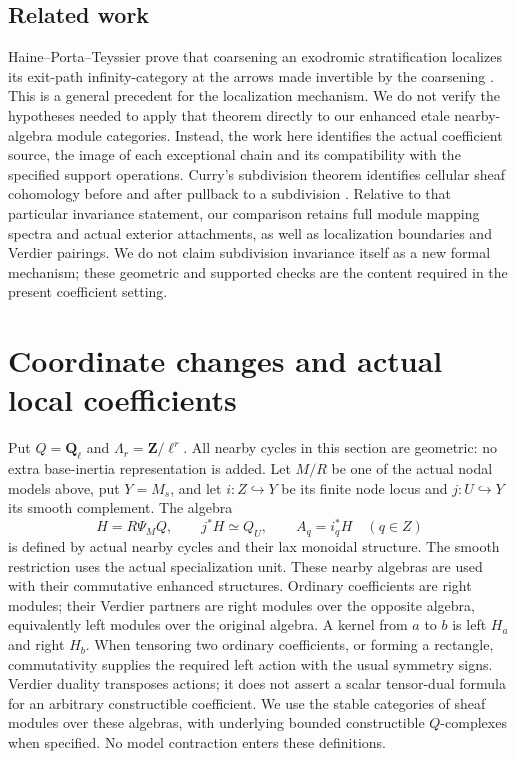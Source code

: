 \documentclass[11pt]{article}
\theoremstyle{definition}
\theoremstyle{remark}
\newcommand{\Qell}{\mathbf Q_\ell}
\begin{document}
\subsection{Related work}
Haine--Porta--Teyssier prove that coarsening an exodromic
stratification localizes its exit-path infinity-category at the
arrows made invertible by the coarsening
\cite[Theorem 0.3.1(3)]{HPT}. This is a general precedent for the
localization mechanism. We do not verify the hypotheses needed to
apply that theorem directly to our enhanced etale nearby-algebra
module categories. Instead, the work here identifies the actual
coefficient source, the image of each exceptional chain and its
compatibility with the specified support operations.
Curry's subdivision theorem identifies cellular sheaf cohomology
before and after pullback to a subdivision
\cite[Theorem 6.12]{Curry}. Relative to that particular invariance
statement, our comparison retains full module mapping spectra and
actual exterior attachments, as well as localization boundaries and
Verdier pairings. We do not claim subdivision invariance itself as a
new formal mechanism; these geometric and supported checks are the
content required in the present coefficient setting.

\section{Coordinate changes and actual local coefficients}
\label{sec:local-source}
Put $Q=\Qell$ and $\Lambda_r=\mathbf Z/\ell^r$.
All nearby cycles in this section are geometric: no extra base-inertia
representation is added.  Let $M/R$ be one of the actual nodal models
above, put $Y=M_s$, and let $i:Z\hookrightarrow Y$ be its finite node
locus and $j:U\hookrightarrow Y$ its smooth complement.  The algebra
\[
 H=R\Psi_M Q,\qquad j^*H\simeq Q_U,\qquad A_q=i_q^*H
 \quad(q\in Z)
\]
is defined by actual nearby cycles and their lax monoidal structure.
The smooth restriction uses the actual specialization unit.
These nearby algebras are used with their commutative enhanced
structures. Ordinary coefficients are right modules; their Verdier
partners are right modules over the opposite algebra, equivalently
left modules over the original algebra. A kernel from $a$ to $b$
is left $H_a$ and right $H_b$. When tensoring two ordinary
coefficients, or forming a rectangle, commutativity supplies the
required left action with the usual symmetry signs. Verdier duality
transposes actions; it does not assert a scalar tensor-dual formula
for an arbitrary constructible coefficient.
We use the stable categories of sheaf modules over these algebras,
with underlying bounded constructible $Q$-complexes when specified.
No model contraction enters these definitions.
\end{document}
